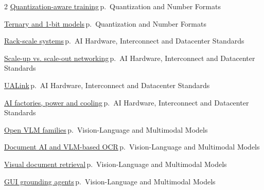 \documentclass[10pt,a4paper,openany]{report}
\begin{document}
\begin{multicols}{2}
\hyperref[c:quant-4]{Quantization-aware training}\,{\color{muted}\scriptsize p.\,\pageref{c:quant-4}} {\color{muted}\scriptsize Quantization and Number Formats}\par\vspace{2pt}
\hyperref[c:quant-6]{Ternary and 1-bit models}\,{\color{muted}\scriptsize p.\,\pageref{c:quant-6}} {\color{muted}\scriptsize Quantization and Number Formats}\par\vspace{2pt}
\hyperref[c:hardware-0]{Rack-scale systems}\,{\color{muted}\scriptsize p.\,\pageref{c:hardware-0}} {\color{muted}\scriptsize AI Hardware, Interconnect and Datacenter Standards}\par\vspace{2pt}
\hyperref[c:hardware-2]{Scale-up vs. scale-out networking}\,{\color{muted}\scriptsize p.\,\pageref{c:hardware-2}} {\color{muted}\scriptsize AI Hardware, Interconnect and Datacenter Standards}\par\vspace{2pt}
\hyperref[c:hardware-3]{UALink}\,{\color{muted}\scriptsize p.\,\pageref{c:hardware-3}} {\color{muted}\scriptsize AI Hardware, Interconnect and Datacenter Standards}\par\vspace{2pt}
\hyperref[c:hardware-12]{AI factories, power and cooling}\,{\color{muted}\scriptsize p.\,\pageref{c:hardware-12}} {\color{muted}\scriptsize AI Hardware, Interconnect and Datacenter Standards}\par\vspace{2pt}
\hyperref[c:vlm-1]{Open VLM families}\,{\color{muted}\scriptsize p.\,\pageref{c:vlm-1}} {\color{muted}\scriptsize Vision-Language and Multimodal Models}\par\vspace{2pt}
\hyperref[c:vlm-4]{Document AI and VLM-based OCR}\,{\color{muted}\scriptsize p.\,\pageref{c:vlm-4}} {\color{muted}\scriptsize Vision-Language and Multimodal Models}\par\vspace{2pt}
\hyperref[c:vlm-5]{Visual document retrieval}\,{\color{muted}\scriptsize p.\,\pageref{c:vlm-5}} {\color{muted}\scriptsize Vision-Language and Multimodal Models}\par\vspace{2pt}
\hyperref[c:vlm-6]{GUI grounding agents}\,{\color{muted}\scriptsize p.\,\pageref{c:vlm-6}} {\color{muted}\scriptsize Vision-Language and Multimodal Models}\par\vspace{2pt}

\end{multicols}
\end{document}
